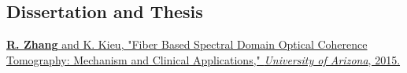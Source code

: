 \documentclass[letterpaper,9pt]{article}
\renewenvironment{itemize}{
  \begin{list}{}{
    \setlength{\topsep}{0pt}
    \setlength{\itemsep}{0pt}
    \setlength{\parsep}{0pt}
    \setlength{\partopsep}{0pt}
    \setlength{\leftmargin}{1.5em}
  }
}{\end{list}}
\begin{document}
\subsection*{Dissertation and Thesis}

\begin{itemize}
  \item \href{https://scholar.google.com/citations?view_op=view_citation&hl=en&user=PpPf3BoAAAAJ&citation_for_view=PpPf3BoAAAAJ:9yKSN-GCB0IC}{{\bf R. Zhang} and K. Kieu, "Fiber Based Spectral Domain Optical Coherence Tomography: Mechanism and Clinical Applications," {\it University of Arizona}, 2015.}

\end{itemize}





\bigskip
\end{document}
